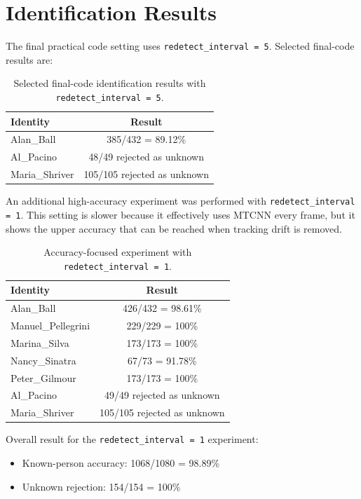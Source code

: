 \documentclass[11pt,a4paper]{article}
\begin{document}
\section{Identification Results}

The final practical code setting uses \texttt{redetect\_interval = 5}. Selected final-code results are:

\begin{table}[h]
\centering
\begin{tabular}{lc}
\toprule
\textbf{Identity} & \textbf{Result} \\
\midrule
Alan\_Ball & 385/432 = 89.12\% \\
Al\_Pacino & 48/49 rejected as unknown \\
Maria\_Shriver & 105/105 rejected as unknown \\
\bottomrule
\end{tabular}
\caption{Selected final-code identification results with \texttt{redetect\_interval = 5}.}
\end{table}

An additional high-accuracy experiment was performed with \texttt{redetect\_interval = 1}. This setting is slower because it effectively uses MTCNN every frame, but it shows the upper accuracy that can be reached when tracking drift is removed.

\begin{table}[h]
\centering
\begin{tabular}{lc}
\toprule
\textbf{Identity} & \textbf{Result} \\
\midrule
Alan\_Ball & 426/432 = 98.61\% \\
Manuel\_Pellegrini & 229/229 = 100\% \\
Marina\_Silva & 173/173 = 100\% \\
Nancy\_Sinatra & 67/73 = 91.78\% \\
Peter\_Gilmour & 173/173 = 100\% \\
Al\_Pacino & 49/49 rejected as unknown \\
Maria\_Shriver & 105/105 rejected as unknown \\
\bottomrule
\end{tabular}
\caption{Accuracy-focused experiment with \texttt{redetect\_interval = 1}.}
\end{table}

Overall result for the \texttt{redetect\_interval = 1} experiment:

\begin{itemize}[noitemsep]
    \item Known-person accuracy: 1068/1080 = 98.89\%
    \item Unknown rejection: 154/154 = 100\%
\end{itemize}
\end{document}
